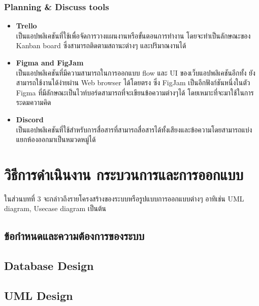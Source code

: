 \documentclass[12pt,oneside,openright,a4paper]{cpe-thai-project}
\begin{document}
\subsection{Planning \& Discuss tools}
\begin{itemize}
\item \textbf{Trello} \\
\hspace*{1cm} เป็นแอปพลิเคชันที่ใช้เพื่อจัดการวางแผนงานหรือขั้นตอนการทำงาน โดยจะทำเป็นลักษณะของ Kanban board ซึ่งสามารถติดตามสถานะต่างๆ และปริมาณงานได้
\item \textbf{Figma and FigJam} \\
\hspace*{1cm} เป็นแอปพลิเคชันที่มีความสามารถในการออกแบบ flow และ UI ของเว็บแอปพลิเคชันอีกทั้ง ยังสามารถใช้งานได้ง่ายผ่าน Web browser ได้โดยตรง ซึ่ง FigJam เป็นอีกฟังก์ชันหนึ่งในตัว Figma ที่มีลักษณะเป็นไวท์บอร์ดสามารถที่จะเขียนข้อความต่างๆได้ โดยเหมาะที่จะมาใช้ในการระดมความคิด
\item \textbf{Discord} \\
\hspace*{1cm} เป็นแอปพลิเคชันที่ใช้สำหรับการสื่อสารที่สามารถสื่อสารได้ทั้งเสียงและข้อความโดยสามารถแบ่งแยกห้องออกมาเป็นหมวดหมู่ได้
\end{itemize}



\chapter{วิธีการดำเนินงาน กระบวนการและการออกแบบ}

ในส่วนบทที่ 3 จะกล่าวถึงรายโครงสร้างของระบบหรือรูปแบบการออกแบบต่างๆ อาทิเช่น UML diagram, Usecase diagram เป็นต้น

\section{ข้อกำหนดและความต้องการของระบบ}

\section{Database Design}

\section{UML Design}
\end{document}
